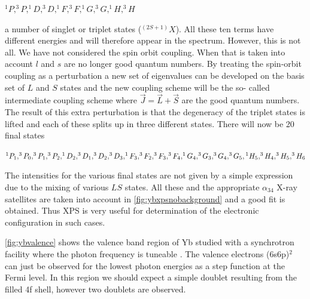 \vspace{0.3cm}

\noindent $^{1}P, ^{3}P, ^{1}D, ^{3}D, ^{1}F, ^{3}F, ^{1}G, ^{3}G, ^{1}H, ^{3}H$

\vspace{0.3cm}

\noindent a number of singlet or triplet states ($^{(2S+1)}X$). All these ten terms have different energies and will therefore appear in the spectrum. However, this is not all. We have not considered the spin orbit coupling. When that is taken into account $l$ and $s$ are no longer good quantum numbers. By treating the spin-orbit coupling as a perturbation a new set of eigenvalues can be developed on the basis set of $L$ and $S$ states and the new coupling scheme will be the so- called intermediate coupling scheme where $\vec{J} = \vec{L}+\vec{S}$ are the good quantum numbers. The result of this extra perturbation is that the degeneracy of the triplet states is lifted and each of these splits up in three different states. There will now be 20 final states

\vspace{0.3cm}

\noindent $^{1}P_{1}, ^{3}P_{0}, ^{3}P_{1}, ^{3}P_{2}, ^{1}D_{2}, ^{3}D_{1}, ^{3}D_{2}, ^{3}D_{3}, ^{1}F_{3}, ^{3}F_{2}, ^{3}F_{3}, ^{3}F_{4}, ^{1}G_{4}, ^{3}G_{3}, ^{3}G_{4}, ^{3}G_{5},\\
^{1}H_{5}, ^{3}H_{4}, ^{3}H_{5}, ^{3}H_{6}$
          
\vspace{0.3cm}

The intensities for the various final states are not given by a simple expression due to the mixing of various $LS$ states. All these and the appropriate $\alpha_{34}$ X-ray satellites are taken into account in \autoref{fig:ybxpsnobackground} and a good fit is obtained. Thus XPS is very useful for determination of the electronic configuration in such cases.

\autoref{fig:ybvalence} shows the valence band region of Yb studied with a synchrotron facility where the photon frequency is tuneable \cite{gerken}. The valence  electrons  (6s6p)$^{2}$ can just be observed for the lowest photon energies as a step function at the Fermi level. In this region we should expect a simple doublet resulting from the filled 4f shell, however two doublets are observed.

